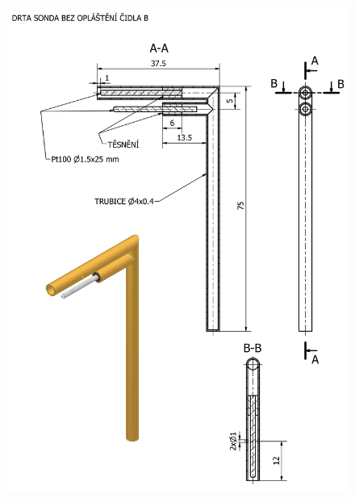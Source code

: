  \label{fig:sonda-bez-stineni-B-vykres}
    \begin{figure}[ht!]
        \centering
        \includegraphics[width=\textwidth]{400_SIMULACE_KONSTRUKCNICH_UPRAV/Vykresy_rendery/Sonda_bez_stineni_B_vykres.png}
        
    \end{figure}
    \newpage
{} \label{fig:sonda-se-stinenim-B-vykres}
